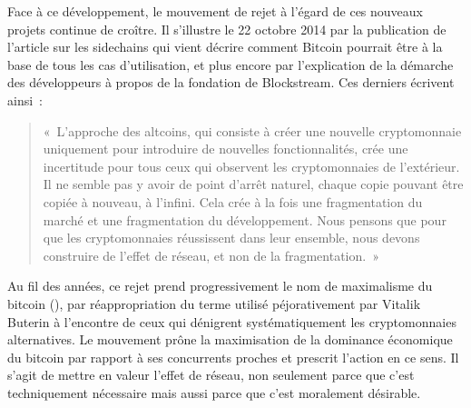 Face à ce développement, le mouvement de rejet à l'égard de ces nouveaux projets continue de croître. Il s'illustre le 22 octobre 2014 par la publication de l'article sur les sidechains qui vient décrire comment Bitcoin pourrait être à la base de tous les cas d'utilisation, et plus encore par l'explication de la démarche des développeurs à propos de la fondation de Blockstream. Ces derniers écrivent ainsi~:

\begin{quote}
«~L'approche des altcoins, qui consiste à créer une nouvelle cryptomonnaie uniquement pour introduire de nouvelles fonctionnalités, crée une incertitude pour tous ceux qui observent les cryptomonnaies de l'extérieur. Il ne semble pas y avoir de point d'arrêt naturel, chaque copie pouvant être copiée à nouveau, à l'infini. Cela crée à la fois une fragmentation du marché et une fragmentation du développement. Nous pensons que pour que les cryptomonnaies réussissent dans leur ensemble, nous devons construire de l'effet de réseau, et non de la fragmentation.~»
\end{quote}

Au fil des années, ce rejet prend progressivement le nom de maximalisme du bitcoin (), par réappropriation du terme utilisé péjorativement par Vitalik Buterin à l'encontre de ceux qui dénigrent systématiquement les cryptomonnaies alternatives. Le mouvement prône la maximisation de la dominance économique du bitcoin par rapport à ses concurrents proches et prescrit l'action en ce sens. Il s'agit de mettre en valeur l'effet de réseau, non seulement parce que c'est techniquement nécessaire mais aussi parce que c'est moralement désirable.

